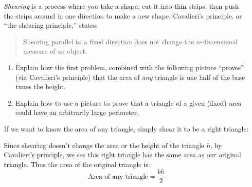 \documentclass[nooutcomes,noauthor,handout,hints,12pt]{ximera}
\begin{document}
\begin{question}
  \emph{Shearing} is a process where you take a shape, cut it into thin strips, 
  then push the strips around in one direction to make a new shape.  
  Cavalieri's principle, or ``the shearing principle,'' states:
  \begin{quote}
    Shearing parallel to a fixed direction does not change the
    $n$-dimensional measure of an object.
  \end{quote}
 \begin{enumerate}
  \item Explain how the first problem, combined with the following
  picture ``proves'' (via Cavalieri's principle) that the area of \emph{any}
  triangle is one half of the base times the height.
  \begin{center}
  \end{center}
  \item Explain how to use a picture to prove that a triangle of a
    given (fixed) area could have an arbitrarily large perimeter.
  \end{enumerate}
  
  \begin{freeResponse}
    If we want to know the area of any triangle, simply shear it to be a right triangle:
      \begin{center}
      \end{center}
    Since shearing doesn't change the area or the height of the
    triangle $h$, by Cavalieri's principle, we see this right triangle
    has the same area as our original triangle. Thus the area of the
    original triangle is:
    \[
    \text{Area of any triangle} = \frac{bh}{2}
    \]
  \end{freeResponse}
\end{question}
\mynewpage
\end{document}
